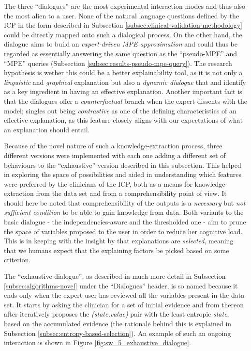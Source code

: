 The three \enquote{dialogues} are the most experimental interaction modes and thus also the most alien to a user.
None of the natural language questions defined by the ICP in the form described in Subsection \ref{subsec:clinical-validation-methodology} could be directly mapped onto such a dialogical process.
On the other hand, the dialogue aims to build an \textit{expert-driven MPE approximation} and could thus be regarded as essentially answering the same question as the \enquote{pseudo-MPE} and \enquote{MPE} queries (Subsection \ref{subsec:results-pseudo-mpe-query}).
The research hypothesis is wether this could be a better explainability tool, as it is not only a \textit{linguistic} and \textit{graphical} explanation but also a \textit{dynamic dialogue} that \citet{Hilton1990} and \citet{lacave2002review} identify as a key ingredient in having an effective explanation.
Another important fact is that the dialogues offer a \textit{counterfactual} branch when the expert dissents with the model; \citet{miller2018explanation} singles out being \textit{contrastive} as one of the defining characteristics of an effective explanation, as this feature closely aligns with our expectations of what an explanation should entail.

Because of the novel nature of such a knowledge-extraction process, three different versions were implemented with each one adding a different set of behaviours to the \enquote{exhaustive} version described in this subsection.
This helped in exploring the space of possibilities and aided in understanding which features were preferred by the clinicians of the ICP, both as a means for knowledge-extraction from the data set and from a comprehensibility point of view.
It should here be noted that comprehensibility of the outputs is a \textit{necessary} but \textit{not sufficient condition} to be able to gain knowledge from data.
Both variants to the basic dialogue - the independencies-aware and the thresholded one - aim to prune the space of variables proposed to the user in order to reduce her cognitive load.
This is in keeping with the insight by \citet{miller2018explanation} that explanations are \textit{selected}, meaning that we humans expect that the explaining factors be picked based on some criterion.

The \enquote{exhaustive dialogue}, as described in much more detail in Subsection \ref{subsec:algorithms-novel} under the \enquote{Dialogues} header, is so named because it ends only when the expert user has reviewed all the variables present in the data set.
It starts by asking the clinician for a set of initial evidence and from thereon after iteratively proposes the \textit{(state,value)} pair with the least entropic \textit{state}, based on the accumulated evidence (the rationale behind this is explained in Subsection \ref{subsec:entropy-based-selection}).
An example of such an ongoing interaction is shown in Figure \ref{fig:sw_5_exhaustive_dialogue}.

